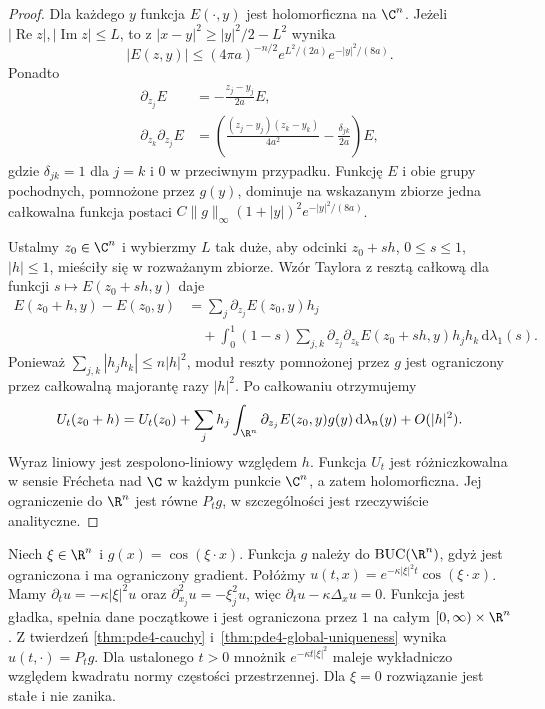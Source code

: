 \begin{proof}
Dla każdego $y$ funkcja $E(\cdot,y)$ jest holomorficzna
na $\C^n$. Jeżeli $|\operatorname{Re}z|,|\operatorname{Im}z|\leq L$,
to z $|x-y|^2\geq |y|^2/2-L^2$ wynika
\[
 |E(z,y)|\leq(4\pi a)^{-n/2}e^{L^2/(2a)}e^{-|y|^2/(8a)}.
\]
Ponadto
\[
 \begin{aligned}
 \partial_{z_j}E&=-\frac{z_j-y_j}{2a}E,\\
 \partial_{z_k}\partial_{z_j}E
 &=\left(\frac{(z_j-y_j)(z_k-y_k)}{4a^2}
 -\frac{\delta_{jk}}{2a}\right)E,
 \end{aligned}
\]
gdzie $\delta_{jk}=1$ dla $j=k$ i $0$ w przeciwnym
przypadku. Funkcję $E$ i obie grupy pochodnych,
pomnożone przez $g(y)$, dominuje na wskazanym
zbiorze jedna całkowalna funkcja postaci
$C\|g\|_\infty(1+|y|)^2e^{-|y|^2/(8a)}$.

Ustalmy $z_0\in\C^n$ i wybierzmy $L$ tak duże,
aby odcinki $z_0+sh$, $0\leq s\leq1$, $|h|\leq1$,
mieściły się w rozważanym zbiorze. Wzór Taylora
z resztą całkową dla funkcji $s\mapsto E(z_0+sh,y)$ daje
\[
 \begin{aligned}
 E(z_0+h,y)-E(z_0,y)
 &=\sum_j\partial_{z_j}E(z_0,y)h_j\\
 &\quad+\int_0^1(1-s)\sum_{j,k}
 \partial_{z_j}\partial_{z_k}E(z_0+sh,y)h_jh_k\,
 \mathrm d\lambda_1(s).
 \end{aligned}
\]
Ponieważ $\sum_{j,k}|h_jh_k|\leq n|h|^2$,
moduł reszty pomnożonej przez $g$ jest ograniczony
przez całkowalną majorantę razy $|h|^2$. Po całkowaniu
otrzymujemy
\[
 U_t(z_0+h)=U_t(z_0)+\sum_jh_j
 \int_{\R^n}\partial_{z_j}E(z_0,y)g(y)\,\mathrm d\lambda_n(y)
 +O(|h|^2).
\]
Wyraz liniowy jest zespolono-liniowy względem $h$.
Funkcja $U_t$ jest różniczkowalna w sensie Frécheta
nad $\C$ w każdym punkcie $\C^n$, a zatem holomorficzna.
Jej ograniczenie do $\R^n$ jest równe $P_tg$,
w szczególności jest rzeczywiście analityczne.
\end{proof}

\begin{przyklad}
Niech $\xi\in\R^n$ i $g(x)=\cos(\xi\cdot x)$.
Funkcja $g$ należy do $\mathrm{BUC}(\R^n)$,
gdyż jest ograniczona i ma ograniczony gradient.
Połóżmy $u(t,x)=e^{-\kappa|\xi|^2t}\cos(\xi\cdot x)$.
Mamy $\partial_tu=-\kappa|\xi|^2u$ oraz
$\partial_{x_j}^2u=-\xi_j^2u$, więc
$\partial_tu-\kappa\Delta_xu=0$. Funkcja jest gładka,
spełnia dane początkowe i jest ograniczona przez $1$
na całym $[0,\infty)\times\R^n$. Z twierdzeń
\ref{thm:pde4-cauchy} i~\ref{thm:pde4-global-uniqueness}
wynika $u(t,\cdot)=P_tg$. Dla ustalonego $t>0$
mnożnik $e^{-\kappa t|\xi|^2}$ maleje wykładniczo
względem kwadratu normy częstości przestrzennej.
Dla $\xi=0$ rozwiązanie jest stałe i nie zanika.
\end{przyklad}


